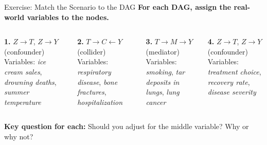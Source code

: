 \documentclass[aspectratio=169,10pt]{beamer}
\begin{document}
\begin{frame}{Exercise: Match the Scenario to the DAG}
\textbf{For each DAG, assign the real-world variables to the nodes.}

\vspace{0.3em}
\begin{columns}[T]
\textbf{1.} \; $Z \to T$, \; $Z \to Y$\\ {\scriptsize (confounder)}\\[0.3em]
Variables: \emph{ice cream sales}, \emph{drowning deaths}, \emph{summer temperature}

\vspace{0.5em}
\textbf{2.} \; $T \to C \leftarrow Y$\\ {\scriptsize (collider)}\\[0.3em]
Variables: \emph{respiratory disease}, \emph{bone fractures}, \emph{hospitalization}

\textbf{3.} \; $T \to M \to Y$\\ {\scriptsize (mediator)}\\[0.3em]
Variables: \emph{smoking}, \emph{tar deposits in lungs}, \emph{lung cancer}

\vspace{0.5em}
\textbf{4.} \; $Z \to T$, \; $Z \to Y$\\ {\scriptsize (confounder)}\\[0.3em]
Variables: \emph{treatment choice}, \emph{recovery rate}, \emph{disease severity}
\end{columns}

\vspace{0.5em}
\pause
{\small \textbf{Key question for each:} Should you adjust for the middle variable? Why or why not?}
\end{frame}
\end{document}
